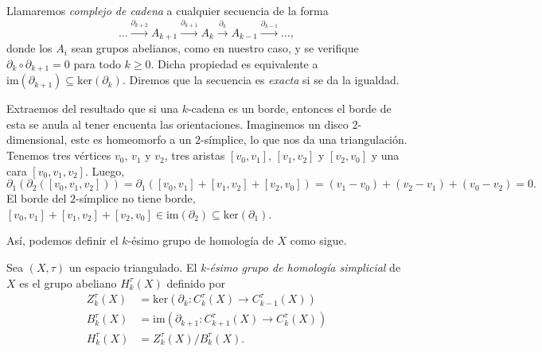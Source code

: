 \begin{remark}
    Llamaremos \textit{complejo de cadena} a cualquier secuencia de la forma
        \begin{equation*}
            \dots \overset{\partial_{k+2}}{\longrightarrow} A_{k+1} \overset{\partial_{k+1}}{\longrightarrow} A_{k} \overset{\partial_{k}}{\longrightarrow} A_{k-1} \overset{\partial_{k-1}}{\longrightarrow} \dots,
        \end{equation*}
        donde los $A_i$ sean grupos abelianos, como en nuestro caso, y se verifique $\partial_{k}\circ\partial_{k+1}=0$ para todo $k\ge 0$. Dicha propiedad es equivalente a $\text{im}(\partial_{k+1})\subseteq\text{ker}(\partial_k)$. Diremos que la secuencia es \textit{exacta} si se da la igualdad.
\end{remark}

\bigskip

Extraemos del resultado que si una $k$-cadena es un borde, entonces el borde de esta se anula al tener encuenta las orientaciones. Imaginemos un disco $2$-dimensional, este es homeomorfo a un $2$-símplice, lo que nos da una triangulación. Tenemos tres vértices $v_0$, $v_1$ y $v_2$, tres aristas $[v_0,v_1]$, $[v_1,v_2]$ y $[v_2,v_0]$ y una cara $[v_0, v_1, v_2]$. Luego,
\begin{equation*}
    \partial_1(\partial_2([v_0, v_1, v_2])) = \partial_1([v_0,v_1]+[v_1,v_2]+[v_2,v_0]) = (v_1-v_0) + (v_2-v_1) + (v_0-v_2) = 0. 
\end{equation*}
El borde del $2$-símplice no tiene borde, $[v_0,v_1]+[v_1,v_2]+[v_2,v_0]\in \text{im}(\partial_2) \subseteq \text{ker}(\partial_1)$.

Así, podemos definir el $k$-ésimo grupo de homología de $X$ como sigue.

\begin{definition}
    Sea $(X,\tau)$ un espacio triangulado. El \textit{k-ésimo grupo de homología simplicial} de $X$ es el grupo abeliano $H^{\tau}_k(X)$ definido por
    \begin{align*}
        Z^{\tau}_k(X) &= \text{ker}(\partial_k: C^{\tau}_k(X) \to C^{\tau}_{k-1}(X)) \\
        B^{\tau}_k(X) &= \text{im}(\partial_{k+1}: C^{\tau}_{k+1}(X) \to C^{\tau}_{k}(X)) \\
        H^{\tau}_k(X) &= Z^{\tau}_k(X)/B^{\tau}_k(X).
    \end{align*}
\end{definition}

